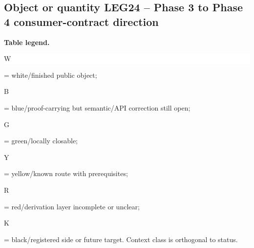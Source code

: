 \subsection*{Object or quantity LEG24 -- Phase 3 to Phase 4 consumer-contract direction}
\hypertarget{objproof:LEG24}{}
\par\smallskip\noindent\begin{minipage}{0.99\linewidth}\footnotesize\raggedright\textbf{Table legend.} \colorbox{white}{\strut W} = white/finished public object; \colorbox{cyan!20}{\strut B} = blue/proof-carrying but semantic/API correction still open; \colorbox{green!18}{\strut G} = green/locally closable; \colorbox{yellow!25}{\strut Y} = yellow/known route with prerequisites; \colorbox{red!20}{\strut R} = red/derivation layer incomplete or unclear; \colorbox{black!18}{\strut K} = black/registered side or future target. Context class is orthogonal to status.\end{minipage}\par\vspace{0.25em}
